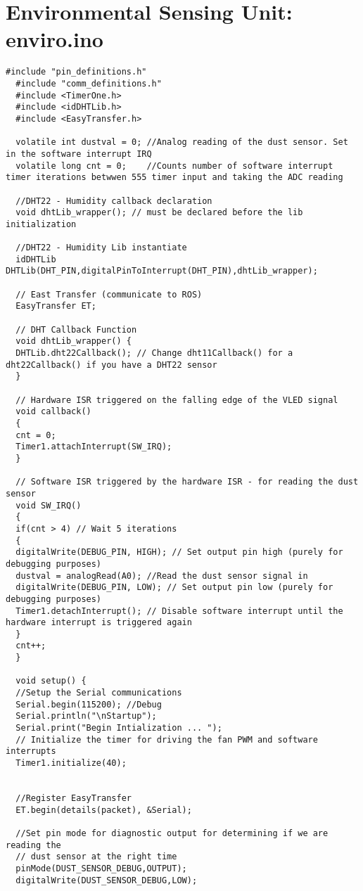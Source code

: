 \section*{Environmental Sensing Unit: enviro.ino}
\begin{lstlisting}[breaklines=true,basicstyle=\tiny]
  #include "pin_definitions.h"
  #include "comm_definitions.h"
  #include <TimerOne.h>
  #include <idDHTLib.h>
  #include <EasyTransfer.h>
  
  volatile int dustval = 0; //Analog reading of the dust sensor. Set in the software interrupt IRQ
  volatile long cnt = 0;    //Counts number of software interrupt timer iterations betwwen 555 timer input and taking the ADC reading
  
  //DHT22 - Humidity callback declaration
  void dhtLib_wrapper(); // must be declared before the lib initialization
  
  //DHT22 - Humidity Lib instantiate
  idDHTLib DHTLib(DHT_PIN,digitalPinToInterrupt(DHT_PIN),dhtLib_wrapper);
  
  // East Transfer (communicate to ROS)
  EasyTransfer ET;
  
  // DHT Callback Function
  void dhtLib_wrapper() {
  DHTLib.dht22Callback(); // Change dht11Callback() for a dht22Callback() if you have a DHT22 sensor
  }
  
  // Hardware ISR triggered on the falling edge of the VLED signal 
  void callback()
  {
  cnt = 0;
  Timer1.attachInterrupt(SW_IRQ);
  }
  
  // Software ISR triggered by the hardware ISR - for reading the dust sensor
  void SW_IRQ()
  {
  if(cnt > 4) // Wait 5 iterations
  {
  digitalWrite(DEBUG_PIN, HIGH); // Set output pin high (purely for debugging purposes)
  dustval = analogRead(A0); //Read the dust sensor signal in
  digitalWrite(DEBUG_PIN, LOW); // Set output pin low (purely for debugging purposes)
  Timer1.detachInterrupt(); // Disable software interrupt until the hardware interrupt is triggered again
  }
  cnt++;
  }
  
  void setup() {
  //Setup the Serial communications
  Serial.begin(115200); //Debug
  Serial.println("\nStartup");
  Serial.print("Begin Intialization ... ");
  // Initialize the timer for driving the fan PWM and software interrupts
  Timer1.initialize(40);
  
  
  //Register EasyTransfer 
  ET.begin(details(packet), &Serial); 
  
  //Set pin mode for diagnostic output for determining if we are reading the 
  // dust sensor at the right time
  pinMode(DUST_SENSOR_DEBUG,OUTPUT);
  digitalWrite(DUST_SENSOR_DEBUG,LOW);
  

\end{lstlisting}
